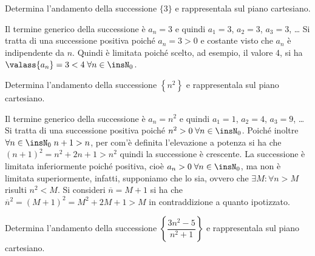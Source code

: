 \begin{exrig}
\begin{esempio}
Determina l'andamento della successione $\{3\}$ e rappresentala sul piano cartesiano.

Il termine generico della successione è $a_n=3$ e quindi $a_1=3$, $a_2=3$, $a_3=3$, \ldots{} Si tratta di una successione positiva poiché $a_n=3>0$ e costante visto che $a_n$ è indipendente da $n$. Quindi è limitata poiché scelto, ad esempio, il valore 4, si ha $\valass{a_n}=3<4\; \forall n\in\insN_0$.
\begin{center}
 
\end{center}
\end{esempio}

\begin{esempio}
Determina l'andamento della successione $\left\{n^2\right\}$ e rappresentala sul piano cartesiano.

Il termine generico della successione è $a_n=n^2$ e quindi $a_1=1$, $a_2=4$, $a_3=9$, \ldots{} Si tratta di una successione positiva poiché $n^2>0\;\forall n\in\insN_0$. Poiché inoltre $\forall n \in \insN_0\; n+1 > n$, per com'è definita l'elevazione a potenza si ha che $(n+1)^2 = n^2+2n+1 > n^2$ quindi la successione è crescente.
La successione è limitata inferiormente poiché positiva, cioè $a_n>0\;\forall n\in\insN_0$, ma non è limitata superiormente, infatti, supponiamo che lo sia, ovvero che $\exists M:\forall n>M$ risulti $n^2<M$. Si consideri $\overline{n}=M+1$ si ha che $\overline{n}^2=(M+1)^2=M^2+2M+1>M$ in contraddizione a quanto ipotizzato.
\begin{center}
 
\end{center}
\end{esempio}

\begin{esempio}
Determina l'andamento della successione $\left\{\dfrac{3n^2-5}{n^2+1}\right\}$ e rappresentala sul piano cartesiano.


\end{esempio}
\end{exrig}

